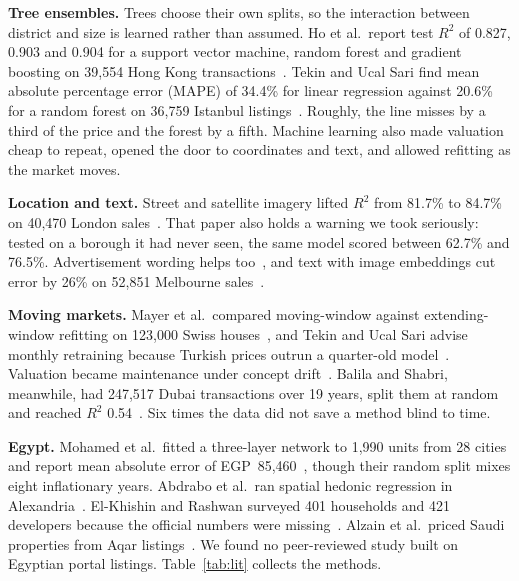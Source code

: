 \documentclass[sigconf,nonacm,10pt]{acmart}
\begin{document}
\textbf{Tree ensembles.} Trees choose their own splits, so the interaction between district and size is learned rather than assumed. Ho et al.\ report test $R^2$ of 0.827, 0.903 and 0.904 for a support vector machine, random forest and gradient boosting on 39,554 Hong Kong transactions~\cite{ho2021predicting}. Tekin and Ucal Sari find mean absolute percentage error (MAPE) of 34.4\% for linear regression against 20.6\% for a random forest on 36,759 Istanbul listings~\cite{tekin2022istanbul}. Roughly, the line misses by a third of the price and the forest by a fifth. Machine learning also made valuation cheap to repeat, opened the door to coordinates and text, and allowed refitting as the market moves.

\textbf{Location and text.} Street and satellite imagery lifted $R^2$ from 81.7\% to 84.7\% on 40,470 London sales~\cite{law2019take}. That paper also holds a warning we took seriously: tested on a borough it had never seen, the same model scored between 62.7\% and 76.5\%. Advertisement wording helps too~\cite{abdallah2016text,baur2023automated}, and text with image embeddings cut error by 26\% on 52,851 Melbourne sales~\cite{hasan2024multimodal}.

\textbf{Moving markets.} Mayer et al.\ compared moving-window against extending-window refitting on 123,000 Swiss houses~\cite{mayer2019estimation}, and Tekin and Ucal Sari advise monthly retraining because Turkish prices outrun a quarter-old model~\cite{tekin2022istanbul}. Valuation became maintenance under concept drift~\cite{gama2014drift}. Balila and Shabri, meanwhile, had 247,517 Dubai transactions over 19 years, split them at random and reached $R^2$ 0.54~\cite{balila2024dubai}. Six times the data did not save a method blind to time.

\textbf{Egypt.} Mohamed et al.\ fitted a three-layer network to 1,990 units from 28 cities and report mean absolute error of EGP~85,460~\cite{mohamed2023egypt}, though their random split mixes eight inflationary years. Abdrabo et al.\ ran spatial hedonic regression in Alexandria~\cite{abdrabo2022alex}. El-Khishin and Rashwan surveyed 401 households and 421 developers because the official numbers were missing~\cite{elkhishin2022}. Alzain et al.\ priced Saudi properties from Aqar listings~\cite{alzain2022saudi}. We found no peer-reviewed study built on Egyptian portal listings. Table~\ref{tab:lit} collects the methods.
\end{document}

